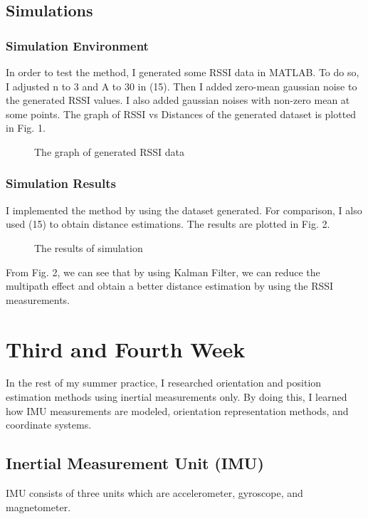 \documentclass[12pt]{article}
\begin{document}
    \subsection{Simulations}

    \subsubsection{Simulation Environment}
    In order to test the method, I generated some RSSI data in MATLAB. 
    To do so, I adjusted n to 3 and A to 30 in (15). 
    Then I added zero-mean gaussian noise to the generated RSSI values. I also 
    added gaussian noises with non-zero mean at some points. 
    The graph of RSSI vs Distances of the generated dataset is plotted 
    in Fig. 1.
    \begin{figure}[H]
        \centerline{}
        \caption{The graph of generated RSSI data}
    \end{figure}

    \subsubsection{Simulation Results}
    I implemented the method by using the dataset generated. For comparison, 
    I also used (15) to obtain distance estimations. The results are 
    plotted in Fig. 2.
    \begin{figure}[H]
        \centerline{}
        \caption{The results of simulation}
    \end{figure}
    From Fig. 2, we can see that by using Kalman Filter, we can reduce 
    the multipath effect and obtain a better distance estimation by using 
    the RSSI measurements.

    \section{Third and Fourth Week}   
    In the rest of my summer practice, I researched orientation and position 
    estimation methods using inertial measurements only. By doing this, I 
    learned how IMU measurements are modeled, 
    orientation representation methods, and coordinate systems.
    \subsection{Inertial Measurement Unit (IMU)}
    IMU consists of three units which are accelerometer, gyroscope, and 
    magnetometer. 
\end{document}
